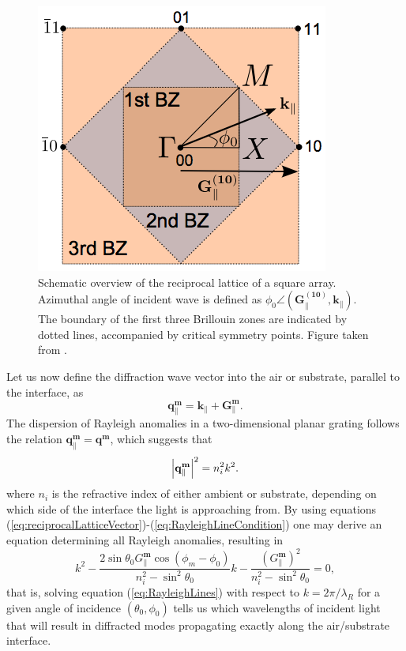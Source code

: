 \begin{figure}
    \centering
    \includegraphics[scale=0.45]{figures/Ch2/ReciprocalLattice.png}
    \caption{Schematic overview of the reciprocal lattice of a square array. Azimuthal angle of incident wave is defined as $\phi_0\angle(\mathbf{G_\parallel^\mathbf{(10)}},\mathbf{k}_\parallel)$. The boundary of the first three Brillouin zones are indicated by dotted lines, accompanied by critical symmetry points. Figure taken from \cite{Brakstad:15}.}
    \label{fig:reciprocallattice}
\end{figure}

Let us now define the diffraction wave vector into the air or substrate, parallel to the interface, as \cite{KretschmannMaradudin}
\begin{equation}
    \mathbf{q}_\parallel^\mathbf{m} = \mathbf{k}_\parallel + \mathbf{G}_\parallel^\mathbf{m}.
    \label{eq:RayleighDiffractedBeam}
\end{equation}
The dispersion of Rayleigh anomalies in a two-dimensional planar grating follows the relation $\mathbf{q}_\parallel^\mathbf{m} = \mathbf{q}^\mathbf{m}$, which suggests that 
\begin{equation}
    \left| \mathbf{q}_\parallel^\mathbf{m} \right|^2 = n_i^2 k^2.
    \label{eq:RayleighLineCondition}
\end{equation}
where $n_i$ is the refractive index of either ambient or substrate, depending on which side of the interface the light is approaching from. By using equations (\ref{eq:reciprocalLatticeVector})-(\ref{eq:RayleighLineCondition}) one may derive an equation determining all Rayleigh anomalies, resulting in \cite{Brakstad:15}
\begin{equation}
    k^2 - \frac{2\sin\theta_0G_\parallel^\mathbf{m}\cos(\phi_m-\phi_0)}{n_i^2-\sin^2\theta_0}k - \frac{(G_\parallel^\mathbf{m})^2}{n_i^2-\sin^2\theta_0} = 0,
    \label{eq:RayleighLines}
\end{equation}
that is, solving equation (\ref{eq:RayleighLines}) with respect to $k=2\pi/\lambda_R$ for a given angle of incidence $(\theta_0,\phi_0)$ tells us which wavelengths of incident light that will result in diffracted modes propagating exactly along the air/substrate interface. 

